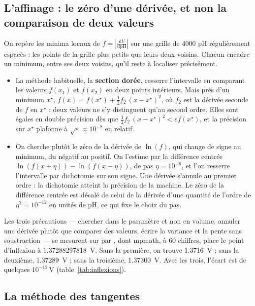 \documentclass[a4paper,11pt]{article}
\newcommand\logo[1]{\hspace{-12pt}\makebox[12pt][l]{#1}}
\newcommand\rmqphys[1]{\begin{tcolorbox}[rmq, bleu]\logo{\faLightbulb}#1\end{tcolorbox}}
\newcommand\gras[1]{\textbf{#1}}
\newcommand\pH{\ensuremath{\mathrm{pH}}\xspace}
\newcommand\ddp[2]{\frac{\mathrm{d}#1}{\mathrm{d}#2}}
\newcommand\pare[1]{\left(#1\right)}
\newcommand\eps{\varepsilon}
\begin{document}
\subsection{L'affinage : le zéro d'une dérivée, et non la comparaison de deux valeurs}
\begin{algo}
On repère les minima locaux de $f=\left|\ddp V\pH\right|$ sur une grille de 4000 \pH régulièrement espacés : les points de la grille plus petits que leurs deux voisins.
Chacun encadre un minimum, entre ses deux voisins, qu'il reste à localiser précisément.
\begin{itemize}
\item La méthode habituelle, la \gras{section dorée}, resserre l'intervalle en comparant les valeurs $f(x_1)$ et $f(x_2)$ en deux points intérieurs.
Mais près d'un minimum $x^\star$, $f(x)=f(x^\star)+\tfrac12f_2\,(x-x^\star)^2$, où $f_2$ est la dérivée seconde de $f$ en $x^\star$ : deux valeurs ne s'y distinguent qu'au second ordre.
Elles sont égales en double précision dès que $\tfrac12f_2\,(x-x^\star)^2<\eps f(x^\star)$, et la précision sur $x^\star$ plafonne à $\sqrt\eps\approx10^{-8}$ en relatif.
\item On cherche plutôt le zéro de la dérivée de $\ln(f)$, qui change de signe au minimum, du négatif au positif.
On l'estime par la différence centrée $\ln\pare{f(x+\eta)}-\ln\pare{f(x-\eta)}$, de pas $\eta=10^{-6}$, et l'on resserre l'intervalle par dichotomie sur son signe.
Une dérivée s'annule au premier ordre : la dichotomie atteint la précision de la machine.
Le zéro de la différence centrée est décalé de celui de la dérivée d'une quantité de l'ordre de $\eta^2=10^{-12}$ en unités de \pH, ce qui fixe le choix du pas.
\end{itemize}
\end{algo}
\rmqphys{Les trois précautions — chercher dans le paramètre et non en volume, annuler une dérivée plutôt que comparer des valeurs, écrire la variance et la pente sans soustraction — se mesurent sur \ce{Fe^2+} par \ce{MnO4-}, dont mpmath, à 60 chiffres, place le point d'inflexion à \qty{1,37288297818}{V}.
Sans la première, on trouve \qty{1,3716}{V} ; sans la deuxième, \qty{1,37289}{V} ; sans la troisième, \qty{1,37300}{V}.
Avec les trois, l'écart est de quelques $10^{-12}$\,V (table~\ref{tab:inflexions}).}

\subsection{La méthode des tangentes}
\end{document}
